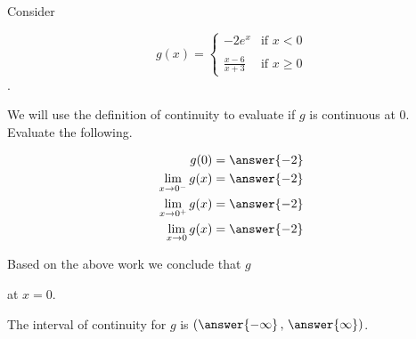 \documentclass{ximera}
\author{Nela Lakos \and Kyle Parsons}
\begin{document}
\begin{exercise}

Consider

\[
g(x) = 
\begin{cases}
-2e^x & \text{if }x<0\\ \\
\frac{x-6}{x+3} & \text{if }x\geq0
\end{cases}
\].

We will use the definition of continuity to evaluate if $g$ is continuous at 0.  Evaluate the following.

\begin{align*}
g(0) &= \answer{-2}\\
\lim_{x\to0^-}g(x) &= \answer{-2}\\
\lim_{x\to0^+}g(x) &= \answer{-2}\\
\lim_{x\to0}g(x) &= \answer{-2}
\end{align*}

\begin{exercise}

Based on the above work we conclude that $g$
\begin{multipleChoice}
\end{multipleChoice}
at $x=0$.

\begin{exercise}

The interval of continuity for $g$ is $\left(\answer{-\infty}\, , \,\answer{\infty}\right)$.

\end{exercise}
\end{exercise}
\end{exercise}
\end{document}
